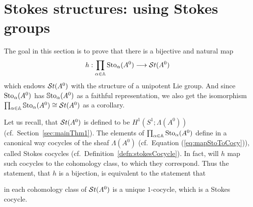 \section{Stokes structures: using Stokes groups}\label{sec:mainThm2}

The goal in this section is to prove that there is a bijective and natural map
\[
  h:\prod_{\alpha\in\mathbb{A}}\operatorname{Sto}_\alpha(A^0)\longrightarrow\mathcal{S}{}t(A^0)
\]
which endows $\mathcal{S}{}t(A^0)$ with the structure of a unipotent Lie group.
And since $\operatorname{Sto}_\alpha(A^0)$ has $\operatorname{\mathbb{S}to}_\alpha(A^0)$ as a faithful
representation, we also get the isomorphism
$\prod_{\alpha\in\mathbb{A}}\operatorname{\mathbb{S}to}_\alpha(A^0)\cong\mathcal{S}{}t(A^0)$ as a corollary.

Let us recall, that $\mathcal{S}{}t(A^0)$ is defined to be $H^1(S^1;\Lambda(A^0))$
(cf.\ Section~\ref{sec:mainThm1}).
The elements of $\prod_{\alpha\in\mathbb{A}}\operatorname{Sto}_\alpha(A^0)$ define in a canonical way
cocycles of the sheaf $\Lambda(A^0)$ (cf.\ Equation (\ref{eq:mapStoToCocy})),
called Stokes cocycles (cf.\ Definition~\ref{defn:stokesCocycle}).
In fact, will $h$ map such cocycles to the cohomology class, to which they
correspond.
Thus the statement, that $h$ is a bijection, is equivalent to the statement
that
\begin{einr}
  in each cohomology class of $\mathcal{S}{}t(A^0)$ is a unique $1$-cocycle, which is a
  Stokes cocycle.
\end{einr}

\vspace{-2pt}%

